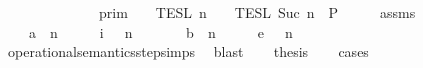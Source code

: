 \begin{isabellebody}
\ \ \ \ \ \ \ \ \ \ {\isasymsupseteq}\ \ {\isasymlbrakk}{\isasymlbrakk}\ {\isasymGamma}\ {\isasymrbrakk}{\isasymrbrakk}\isactrlsub p\isactrlsub r\isactrlsub i\isactrlsub m\ {\isasyminter}\ {\isasymlbrakk}{\isasymlbrakk}\ {\isasymPsi}\ {\isasymrbrakk}{\isasymrbrakk}\isactrlsub T\isactrlsub E\isactrlsub S\isactrlsub L\isactrlbsup {\isasymge}\ n\isactrlesup \ {\isasyminter}\ {\isasymlbrakk}{\isasymlbrakk}\ {\isasymPhi}\ {\isasymrbrakk}{\isasymrbrakk}\isactrlsub T\isactrlsub E\isactrlsub S\isactrlsub L\isactrlbsup {\isasymge}\ Suc\ n\isactrlesup {\isacartoucheclose}\ {\isacharparenleft}\ {\isacharquery}P{\isacharparenright}\isanewline
%
\isadelimproof
%
\endisadelimproof
%
\isatagproof
{}\isamarkupfalse%
\ {\isacharminus}\isanewline
\ \ \isamarkupfalse%
\ assms\ \isamarkupfalse%
\isanewline
\ \ \ \ {\isacharparenleft}a{\isacharparenright}\ {\isacartoucheopen}{\isacharparenleft}{\isasymGamma}\ n\ {\isasymturnstile}\ {\isasymPsi}\ {\isasymtriangleright}\ {\isasymPhi}\ \ {\isasymhookrightarrow}\isactrlsub i\ \ {\isacharparenleft}{\isasymGamma}\ n\ {\isasymturnstile}\ {\isasymPsi}\ {\isasymtriangleright}\ {\isasymPhi}\isanewline
\ \ {\isacharbar}\ {\isacharparenleft}b{\isacharparenright}\ {\isacartoucheopen}{\isacharparenleft}{\isasymGamma}\ n\ {\isasymturnstile}\ {\isasymPsi}\ {\isasymtriangleright}\ {\isasymPhi}\ \ {\isasymhookrightarrow}\isactrlsub e\ \ {\isacharparenleft}{\isasymGamma}\ n\ {\isasymturnstile}\ {\isasymPsi}\ {\isasymtriangleright}\ {\isasymPhi}\isanewline
\ \ \ \ \isamarkupfalse%
\ operational{\isacharunderscore}semantics{\isacharunderscore}step{\isachardot}simps\ \isamarkupfalse%
\ blast\isanewline
\ \ \isamarkupfalse%
\ {\isacharquery}thesis\isanewline
\ \ \isamarkupfalse%
\ {\isacharparenleft}cases{\isacharparenright}\isanewline

\end{isabellebody}
